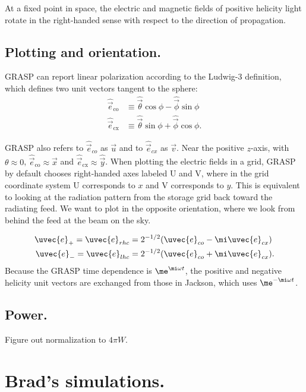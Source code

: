\documentclass[10pt,english]{article}
\begin{document}
At a fixed point in space, the electric and magnetic fields of positive helicity light rotate in the right-handed sense with respect to the direction of propagation.

\subsection*{Plotting and orientation.}

GRASP can report linear polarization according to the Ludwig-3 definition, which defines two unit vectors tangent to the sphere:
\begin{align*}
\hat{\vec{e}}_{\text{co}} &\equiv \hat{\vec{\theta}} \cos \phi - \hat{\vec{\phi}} \sin \phi \\
\hat{\vec{e}}_{\text{cx}} & \equiv \hat{\vec{\theta}} \sin \phi + \hat{\vec{\phi}} \cos \phi.
\end{align*}

GRASP also refers to $\hat{\vec{e}}_{co}$ as $\vec{u}$ and to $\hat{\vec{e}}_{cx}$ as $\vec{v}$. Near the positive $z$-axis, with $\theta \approx 0$, $\hat{\vec{e}}_{\text{co}} \approx \hat{\vec{x}}$ and $\hat{\vec{e}}_{\text{cx}} \approx \hat{\vec{y}}$. When plotting the electric fields in a grid, GRASP by default chooses right-handed axes labeled U and V, where in the grid coordinate system U corresponds to $x$ and V corresponds to $y$. This is equivalent to looking at the radiation pattern from the storage grid back toward the radiating feed. We want to plot in the opposite orientation, where we look from behind the feed at the beam on the sky.

\begin{align*}
\uvec{e}_{+} = \uvec{e}_{rhc} &= 2^{-1/2} (\uvec{e}_{co} - \mi \uvec{e}_{cx}) \\
\uvec{e}_{-} = \uvec{e}_{lhc} &= 2^{-1/2} (\uvec{e}_{co} + \mi \uvec{e}_{cx}).
\end{align*}
Because the GRASP time dependence is $\me^{\mi \omega t}$, the positive and negative helicity unit vectors are exchanged from those in Jackson, which uses $\me^{- \mi \omega t}$.

\subsection*{Power.}

Figure out normalization to $4 \pi \unit{W}$.
\section*{Brad's simulations.}
\end{document}
